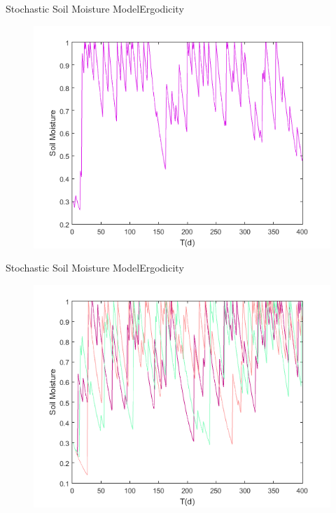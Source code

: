 \documentclass[10pt]{beamer}
\begin{document}
\begin{frame}{Stochastic Soil Moisture Model}{Ergodicity}
\begin{figure}
\centering
\includegraphics[width=.75\textwidth]{s_s.png}
 
\end{figure}
\end{frame}

\begin{frame}{Stochastic Soil Moisture Model}{Ergodicity}
\begin{figure}
\centering
\includegraphics[width=.75\textwidth]{s_m.png}
 
\end{figure}
\end{frame}
\end{document}
